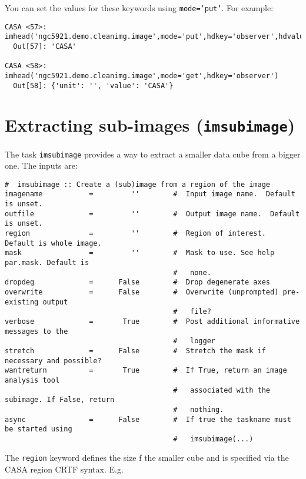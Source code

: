 You can set the values for these keywords using
{\tt mode='put'}.  For example:
\small
\begin{verbatim}
CASA <57>: imhead('ngc5921.demo.cleanimg.image',mode='put',hdkey='observer',hdvalue='CASA')
  Out[57]: 'CASA'

CASA <58>: imhead('ngc5921.demo.cleanimg.image',mode='get',hdkey='observer')
  Out[58]: {'unit': '', 'value': 'CASA'}
\end{verbatim}
\normalsize

\section{Extracting sub-images ({\tt imsubimage})}
\label{section:analysis.imsubimage}

The task {\tt imsubimage} provides a way to extract a smaller data
cube from a bigger one. The inputs are: 

\small
\begin{verbatim}
#  imsubimage :: Create a (sub)image from a region of the image
imagename           =         ''        #  Input image name.  Default is unset.
outfile             =         ''        #  Output image name.  Default is unset.
region              =         ''        #  Region of interest.  Default is whole image.
mask                =         ''        #  Mask to use. See help par.mask. Default is
                                        #   none.
dropdeg             =      False        #  Drop degenerate axes
overwrite           =      False        #  Overwrite (unprompted) pre-existing output
                                        #   file?
verbose             =       True        #  Post additional informative messages to the
                                        #   logger
stretch             =      False        #  Stretch the mask if necessary and possible?
wantreturn          =       True        #  If True, return an image analysis tool
                                        #   associated with the subimage. If False, return
                                        #   nothing.
async               =      False        #  If true the taskname must be started using
                                        #   imsubimage(...)
\end{verbatim}
\normalsize 

The {\tt region} keyword defines the size f the smaller cube and is
specified via the CASA region CRTF syntax.  E.g.

